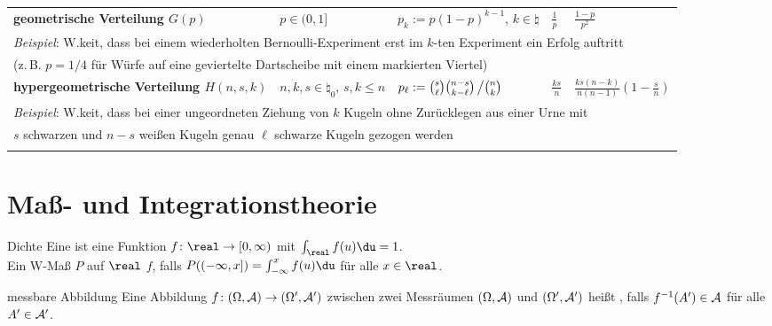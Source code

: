 \begin{landscape}
\begin{tabular}{p{85mm}p{40mm}p{65mm}p{20mm}p{27mm}}
    \addlinespace[5mm]
    \midrule
    \textbf{geometrische Verteilung $G(p)$} &
    $p \in (0, 1]$ &
    $p_k := p (1 - p)^{k-1}$, $k \in \natural$ &
    $\frac{1}{p}$ &
    $\frac{1-p}{p^2}$\\
    \multicolumn{5}{l}{\emph{Beispiel}:
    W.keit, dass bei einem wiederholten Bernoulli-Experiment erst im $k$-ten Experiment ein Erfolg
    auftritt}\\
    \multicolumn{5}{l}{(z.\,B. $p = 1/4$ für Würfe auf eine geviertelte Dartscheibe mit
    einem markierten Viertel)}
    \\

    \addlinespace[5mm]
    \midrule
    \textbf{hypergeometrische Verteilung $H(n, s, k)$} &
    $n, k, s \in \natural_0$, $s, k \le n$ &
    $p_\ell := \binom{s}{\ell} \binom{n-s}{k-\ell} \left/\binom{n}{k}\right.$ &
    $\frac{ks}{n}$ &
    $\frac{ks(n-k)}{n(n-1)}(1-\frac{s}{n})$\\
    \multicolumn{5}{l}{\emph{Beispiel}: W.keit, dass bei einer ungeordneten Ziehung von $k$
    Kugeln ohne Zurücklegen aus einer Urne mit}\\
    \multicolumn{5}{l}{$s$ schwarzen und $n - s$ weißen Kugeln genau
    $\ell$ schwarze Kugeln gezogen werden}\\

    \addlinespace[5mm]
    \bottomrule
\end{tabular}
\end{landscape}

\section{%
    Maß- und Integrationstheorie%
}

\begin{Def}{Dichte}
    Eine  ist eine Funktion
    $f\colon \real \rightarrow [0, \infty)$ mit $\int_\real f(u)\du = 1$.\\
    Ein W-Maß $P$ auf $\real$  $f$, falls
    $P((-\infty, x]) = \int_{-\infty}^x f(u)\du$ für alle $x \in \real$.
\end{Def}

\begin{Def}{messbare Abbildung}
    Eine Abbildung $f\colon (\Omega, \mathcal{A}) \rightarrow (\Omega', \mathcal{A}')$ zwischen zwei Messräumen
    $(\Omega, \mathcal{A})$ und $(\Omega', \mathcal{A}')$ heißt , falls
    $f^{-1}(A') \in \mathcal{A}$ für alle $A' \in \mathcal{A}'$.
\end{Def}

